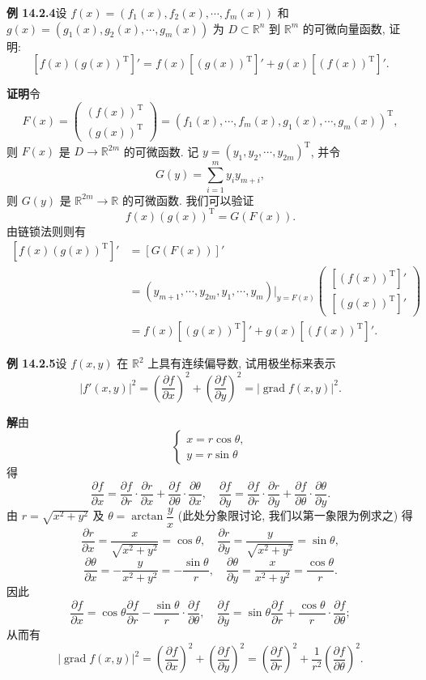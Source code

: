 \documentclass[UTF8, 12pt, fontset=fandol, oneside]{ctexart}
\begin{document}
\noindent\textbf{例 14.2.4}\quad 设 $f(x)=(f_1(x),f_2(x),\cdots,f_m(x))$ 和 $g(x)=(g_1(x),g_2(x),\cdots,g_m(x))$ 为 $D\subset\mathbb R^n$ 到 $\mathbb R^m$ 的可微向量函数, 证明:
\[
  [f(x)(g(x))^\mathrm T]'=f(x)[(g(x))^\mathrm T]'+g(x)[(f(x))^\mathrm T]'.
\]

\noindent\textbf{证明}\quad 令
\[
  F(x)=
  \begin{pmatrix}
    (f(x))^\mathrm T\\
    (g(x))^\mathrm T
  \end{pmatrix}
  =(f_1(x),\cdots,f_m(x),g_1(x),\cdots,g_m(x))^\mathrm T,
\]
则 $F(x)$ 是 $D\to\mathbb R^{2m}$ 的可微函数. 记 $y=(y_1,y_2,\cdots,y_{2m})^\mathrm T$, 并令
\[
  G(y)=\sum_{i=1}^m y_i y_{m+i},
\]
则 $G(y)$ 是 $\mathbb R^{2m}\to\mathbb R$ 的可微函数. 我们可以验证
\[
  f(x)(g(x))^\mathrm T=G(F(x)).
\]
由链锁法则则有
\[
\begin{aligned}
  [f(x)(g(x))^\mathrm T]'
  &=[G(F(x))]'\\
  &=(y_{m+1},\cdots,y_{2m},y_1,\cdots,y_m)\big|_{y=F(x)}
  \begin{pmatrix}
    [(f(x))^\mathrm T]'\\
    [(g(x))^\mathrm T]'
  \end{pmatrix}\\
  &=f(x)[(g(x))^\mathrm T]'+g(x)[(f(x))^\mathrm T]'.
\end{aligned}
\]

\noindent\textbf{例 14.2.5}\quad 设 $f(x,y)$ 在 $\mathbb R^2$ 上具有连续偏导数, 试用极坐标来表示
\[
  |f'(x,y)|^2=
  \left(\frac{\partial f}{\partial x}\right)^2+
  \left(\frac{\partial f}{\partial y}\right)^2
  =|\operatorname{grad}f(x,y)|^2.
\]

\noindent\textbf{解}\quad 由
\[
  \begin{cases}
    x=r\cos\theta,\\
    y=r\sin\theta
  \end{cases}
\]
得
\[
  \frac{\partial f}{\partial x}
  =\frac{\partial f}{\partial r}\cdot\frac{\partial r}{\partial x}
  +\frac{\partial f}{\partial\theta}\cdot\frac{\partial\theta}{\partial x},
  \quad
  \frac{\partial f}{\partial y}
  =\frac{\partial f}{\partial r}\cdot\frac{\partial r}{\partial y}
  +\frac{\partial f}{\partial\theta}\cdot\frac{\partial\theta}{\partial y}.
\]
由 $r=\sqrt{x^2+y^2}$ 及 $\theta=\arctan\dfrac yx$ (此处分象限讨论, 我们以第一象限为例求之) 得
\[
  \frac{\partial r}{\partial x}=\frac{x}{\sqrt{x^2+y^2}}=\cos\theta,\quad
  \frac{\partial r}{\partial y}=\frac{y}{\sqrt{x^2+y^2}}=\sin\theta,
\]
\[
  \frac{\partial\theta}{\partial x}=-\frac{y}{x^2+y^2}=-\frac{\sin\theta}{r},\quad
  \frac{\partial\theta}{\partial y}=\frac{x}{x^2+y^2}=\frac{\cos\theta}{r}.
\]
因此
\[
  \frac{\partial f}{\partial x}
  =\cos\theta\frac{\partial f}{\partial r}
  -\frac{\sin\theta}{r}\cdot\frac{\partial f}{\partial\theta},
  \quad
  \frac{\partial f}{\partial y}
  =\sin\theta\frac{\partial f}{\partial r}
  +\frac{\cos\theta}{r}\cdot\frac{\partial f}{\partial\theta};
\]
从而有
\[
  |\operatorname{grad}f(x,y)|^2
  =
  \left(\frac{\partial f}{\partial x}\right)^2+
  \left(\frac{\partial f}{\partial y}\right)^2
  =
  \left(\frac{\partial f}{\partial r}\right)^2+
  \frac1{r^2}\left(\frac{\partial f}{\partial\theta}\right)^2.
\]
\end{document}
